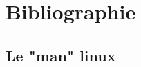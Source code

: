 \documentclass[11pt,a4paper,titlepage, oneside]{article}
\begin{document}
\newpage
\section{{\color{red}Bibliographie}}
	\subsection*{\color{blue}Le "man" linux}
%
%
%
%
%
%
%
%
%
%    
%
%   
%
%
%
%
\end{document}
